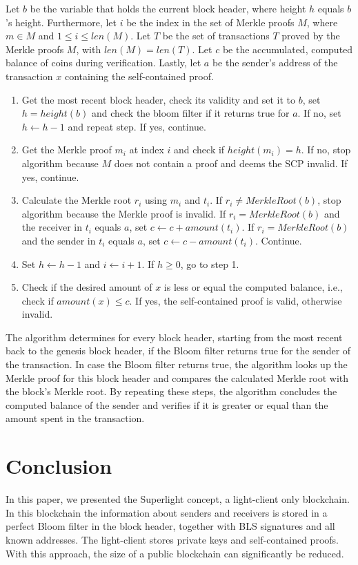 \documentclass[conference]{IEEEtran}
\begin{document}
Let $b$ be the variable that holds the current block header, where height $h$ equals $b$'s height. Furthermore, let $i$ be the index in the set of Merkle proofs $M$, where $m \in M$ and $1 \leq i \leq len(M)$. Let $T$ be the set of transactions $T$ proved by the Merkle proofs $M$, with $len(M) = len(T)$. Let $c$ be the accumulated, computed balance of coins during verification. Lastly, let $a$ be the sender's address of the transaction $x$ containing the self-contained proof.
\begin{enumerate}
 \item Get the most recent block header, check its validity and set it to $b$, set $h = height(b)$ and check the bloom filter if it returns true for $a$. If no, set $h \leftarrow h - 1$ and repeat step. If yes, continue.
 \item Get the Merkle proof $m_i$ at index $i$ and check if $height(m_i) = h$. If no, stop algorithm because $M$ does not contain a proof and deems the SCP invalid. If yes, continue.
 \item Calculate the Merkle root $r_i$ using $m_i$ and $t_i$. If $r_i \neq MerkleRoot(b)$, stop algorithm because the Merkle proof is invalid. If $r_i = MerkleRoot(b)$ and the receiver in $t_i$ equals $a$, set $c \leftarrow c + amount(t_i)$. If $r_i = MerkleRoot(b)$ and the sender in $t_i$ equals $a$, set $c \leftarrow c - amount(t_i)$. Continue.
 \item Set $h \leftarrow h - 1$ and $i \leftarrow i + 1$. If $h \geq 0$, go to step 1.
 \item Check if the desired amount of $x$ is less or equal the computed balance, i.e., check if $amount(x) \leq c$. If yes, the self-contained proof is valid, otherwise invalid.
\end{enumerate}
The algorithm determines for every block header, starting from the most recent back to the genesis block header, if the Bloom filter returns true for the sender of the transaction. In case the Bloom filter returns true, the algorithm looks up the Merkle proof for this block header and compares the calculated Merkle root with the block's Merkle root. By repeating these steps, the algorithm concludes the computed balance of the sender and verifies if it is greater or equal than the amount spent in the transaction.

\section{Conclusion}
In this paper, we presented the Superlight concept, a light-client only blockchain. In this blockchain the information about senders and receivers is stored in a perfect Bloom filter in the block header, together with BLS signatures and all known addresses. The light-client stores private keys and self-contained proofs. With this approach, the size of a public blockchain can significantly be reduced.
\end{document}
